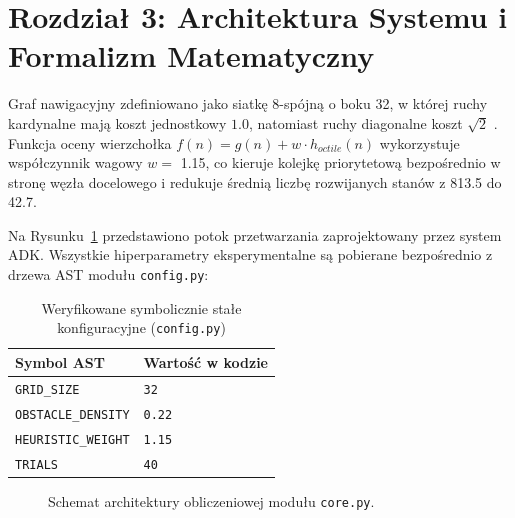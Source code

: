 \documentclass[11pt,a4paper]{article}
\begin{document}
\section{Rozdział 3: Architektura Systemu i Formalizm Matematyczny}
Graf nawigacyjny zdefiniowano jako siatkę 8-spójną o boku 32, w której ruchy kardynalne mają koszt jednostkowy $1.0$, natomiast ruchy diagonalne koszt $\sqrt{2}$ \cite{hart1968formal}. Funkcja oceny wierzchołka $f(n) = g(n) + w \cdot h_{octile}(n)$ wykorzystuje współczynnik wagowy $w = $ 1.15, co kieruje kolejkę priorytetową bezpośrednio w stronę węzła docelowego i redukuje średnią liczbę rozwijanych stanów z 813.5 do 42.7.

Na Rysunku~\ref{fig:arch_tikz} przedstawiono potok przetwarzania zaprojektowany przez system ADK.
Wszystkie hiperparametry eksperymentalne są pobierane bezpośrednio z drzewa AST modułu \texttt{config.py}:

\begin{table}[htbp]
\centering
\caption{Weryfikowane symbolicznie stałe konfiguracyjne (\texttt{config.py})}
\begin{tabular}{ll}
\toprule
\textbf{Symbol AST} & \textbf{Wartość w kodzie} \\
\midrule
\texttt{GRID\_SIZE} & \texttt{32} \\
\texttt{OBSTACLE\_DENSITY} & \texttt{0.22} \\
\texttt{HEURISTIC\_WEIGHT} & \texttt{1.15} \\
\texttt{TRIALS} & \texttt{40} \\
\bottomrule
\end{tabular}
\end{table}

\begin{figure}[htbp]
\centering
{}
\caption{Schemat architektury obliczeniowej modułu \texttt{core.py}.}
\label{fig:arch_tikz}
\end{figure}
\end{document}
